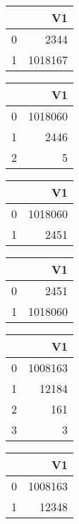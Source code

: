 \bigskip\bigskip
\centering
\begin{tabular}{rr}
  \hline
 & V1 \\ 
  \hline
0 & 2344 \\ 
  1 & 1018167 \\ 
   \hline
\end{tabular}

\bigskip\bigskip
\centering
\begin{tabular}{rr}
  \hline
 & V1 \\ 
  \hline
0 & 1018060 \\ 
  1 & 2446 \\ 
  2 &   5 \\ 
   \hline
\end{tabular}

\bigskip\bigskip
\centering
\begin{tabular}{rr}
  \hline
 & V1 \\ 
  \hline
0 & 1018060 \\ 
  1 & 2451 \\ 
   \hline
\end{tabular}

\bigskip\bigskip
\centering
\begin{tabular}{rr}
  \hline
 & V1 \\ 
  \hline
0 & 2451 \\ 
  1 & 1018060 \\ 
   \hline
\end{tabular}

\bigskip\bigskip
\centering
\begin{tabular}{rr}
  \hline
 & V1 \\ 
  \hline
0 & 1008163 \\ 
  1 & 12184 \\ 
  2 & 161 \\ 
  3 &   3 \\ 
   \hline
\end{tabular}

\bigskip\bigskip
\centering
\begin{tabular}{rr}
  \hline
 & V1 \\ 
  \hline
0 & 1008163 \\ 
  1 & 12348 \\ 
   \hline
\end{tabular}

